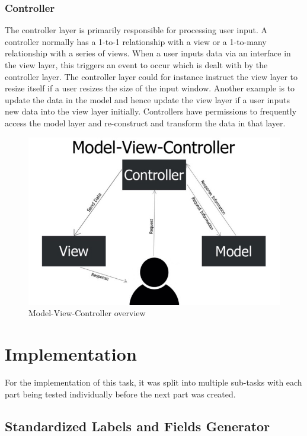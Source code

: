 \subsubsection{Controller}
The controller layer is primarily responsible for processing user input.  A controller normally has a 1-to-1 relationship with a view or a 1-to-many relationship with a series of views.  When a user inputs data via an interface in the view layer,  this triggers an event to occur which is dealt with by the controller layer. The controller layer could for instance instruct the view layer to resize itself if a user resizes the size of the input window.  Another example is to update the data in the model and hence update the view layer if a user inputs new data into the view layer initially.  Controllers have permissions to frequently access the model layer and re-construct and transform the data in that layer.

\begin{figure}[ht]
  \centering
  \includegraphics[scale=0.35]{multicurrency/mvc.jpg}
  \caption{Model-View-Controller overview}
\end{figure}


\section{Implementation}
For the implementation of this task, it was split into multiple sub-tasks with each part being tested individually before the next part was created.
\subsection{Standardized Labels and Fields Generator}

